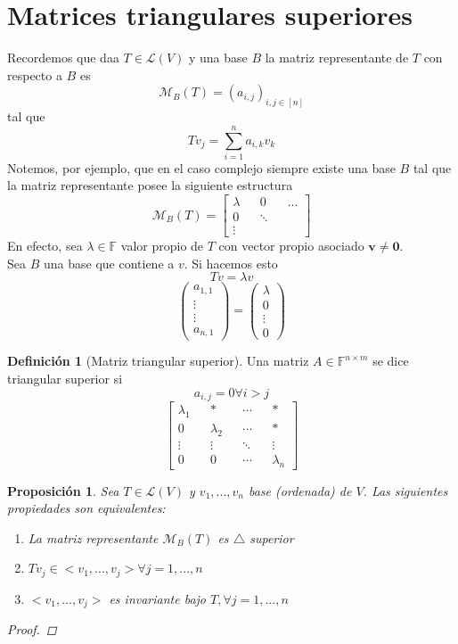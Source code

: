 \documentclass[11pt]{book}
\renewcommand{\vec}[1]{\mathbf{#1}}
\newcommand{\set}[1]{\mathbb{#1}}
\newtheorem{prop}[thm]{Proposición}
\theoremstyle{definition}
\newtheorem{defn}{Definición}[section]
\begin{document}
\section{Matrices triangulares superiores}
Recordemos que daa $T\in\mathcal{L}(V)$ y una base $B$ la matriz representante de $T$ con respecto a $B$ es
\[\mathcal{M}_B(T)=(a_{i,j})_{i,j\in[n]}\]
tal que 
\[Tv_j=\sum^n_{i=1}a_{i,k}v_k\]
Notemos, por ejemplo, que en el caso complejo siempre existe una base $B$ tal que la matriz representante posee la siguiente estructura
\[\mathcal{M}_B(T)=\begin{bmatrix}\lambda && 0 && \ldots\\ 0 && \ddots\\ \vdots \end{bmatrix}\]
En efecto, sea $\lambda\in\set{F}$ valor propio de $T$ con vector propio asociado $\vec{v}\neq\vec{0}$.\\
Sea $B$ una base que contiene a $v$. Si hacemos esto
\[Tv=\lambda v\]
\[\begin{pmatrix}
	a_{1,1}\\
	\vdots\\
	\vdots\\
	a_{n,1}
\end{pmatrix}=\begin{pmatrix}
	\lambda\\
	0\\
	\vdots\\
	0
\end{pmatrix}\]
\begin{defn}[Matriz triangular superior]
	Una matriz $A\in\set{F}^{n\times m}$ se dice triangular superior si
	\[a_{i,j}=0\forall i>j\]
	\[\begin{bmatrix}
		\lambda_1 && * && \cdots && *\\
		0 && \lambda_2 && \cdots && *\\
		\vdots && \vdots && \ddots && \vdots\\
		0 && 0 && \cdots && \lambda_n
	\end{bmatrix}\]
\end{defn}
\begin{prop}
	Sea $T\in\mathcal{L}(V)$ y $v_1,...,v_n$ base (ordenada) de $V$. Las siguientes propiedades son equivalentes:
	\begin{enumerate}[label=\alph*)]
		\item La matriz representante $\mathcal{M}_B(T)$ es $\triangle$ superior

		\item $Tv_j\in<v_1,...,v_j>\forall j=1,...,n$

		\item $<v_1,...,v_j>$ es invariante bajo $T, \forall j=1,...,n$
	\end{enumerate}
	\begin{proof}
		
	\end{proof}
\end{prop}
\end{document}
